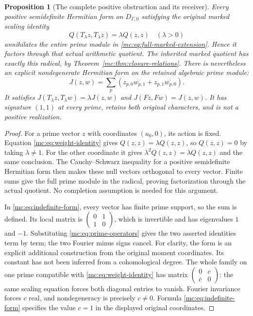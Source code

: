 \documentclass[11pt,a4paper]{article}
\newtheorem{proposition}[theorem]{Proposition}
\theoremstyle{definition}\newtheorem{definition}[theorem]{Definition}
\begin{document}
\begin{proposition}[The complete positive obstruction and its receiver]
\label{mc:prop:positive-obstruction}
Every positive semidefinite Hermitian form on $D_{\Gamma,0}$
satisfying the original marked scaling identity
\[
 Q(T_\lambda z,T_\lambda z)=\lambda Q(z,z)
                       \quad(\lambda>0)
 \tag{MC27}\label{mc:eq:weight-identity}
\]
annihilates the entire prime module in
\eqref{mc:eq:full-marked-extension}. Hence it factors through that
actual arithmetic quotient. The inherited marked quotient has
exactly this radical, by Theorem~\ref{mc:thm:closure-relations}.
There is nevertheless an explicit nondegenerate Hermitian form
on the retained algebraic prime module:
\[
 J(z,w)=\sum_p\left(z_{p,0}\overline{w_{p,1}}
                       +z_{p,1}\overline{w_{p,0}}\right).
 \tag{MC28}\label{mc:eq:indefinite-form}
\]
It satisfies $J(T_\lambda z,T_\lambda w)=\lambda J(z,w)$
and $J(Fz,Fw)=J(z,w)$. It has signature $(1,1)$ at every
prime, retains both original characters, and is not a positive
realization.
\end{proposition}
\begin{proof}
For a prime vector $z$ with coordinates $(u_0,0)$, its action is
fixed. Equation
\eqref{mc:eq:weight-identity} gives $Q(z,z)=\lambda Q(z,z)$,
so $Q(z,z)=0$ by taking $\lambda\ne1$. For the other coordinate
it gives $\lambda^2Q(z,z)=\lambda Q(z,z)$ and the same
conclusion. The Cauchy--Schwarz inequality for a positive
semidefinite Hermitian form then makes these null vectors
orthogonal to every vector. Finite sums give the full prime
module in the radical, proving factorization through the actual
quotient. No completion assumption is needed for this argument.

In \eqref{mc:eq:indefinite-form}, every vector has finite prime
support, so the sum is defined. Its local matrix is
$\left(\begin{smallmatrix}0&1\\1&0\end{smallmatrix}\right)$,
which is invertible and has eigenvalues $1$ and $-1$.
Substituting \eqref{mc:eq:prime-operators} gives the two asserted
identities term by term; the two Fourier minus signs cancel.
For clarity, the form is an explicit additional construction
from the original moment coordinates. Its constant has not been
inferred from a cohomological degree. The whole family on one
prime compatible with \eqref{mc:eq:weight-identity} has matrix
$\left(\begin{smallmatrix}0&c\\\overline c&0\end{smallmatrix}\right)$:
the same scaling equation forces both diagonal entries to vanish.
Fourier invariance forces $c$ real, and nondegeneracy is precisely
$c\ne0$. Formula \eqref{mc:eq:indefinite-form} specifies the value
$c=1$ in the displayed original coordinates.
\end{proof}
\end{document}
